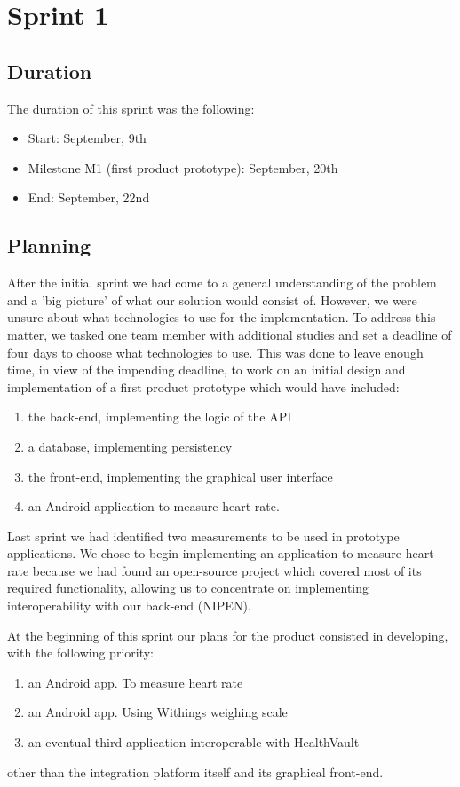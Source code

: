 	
\chapter{Sprint 1}
\label{Sprint1}

\section{Duration}
The duration of this sprint was the following:
\begin{itemize}
\item Start: September, 9th
\item Milestone M1 (first product prototype): September, 20th
\item End: September, 22nd
\end{itemize}

\section{Planning}

After the initial sprint we had come to a general understanding of the problem and a 'big picture' of what our solution would consist of. 
However, we were unsure about what technologies to use for the implementation. 
To address this matter, we tasked one team member with additional studies and set a deadline of four days to choose what technologies to use.
This was done to leave enough time, in view of the impending deadline, to work on an initial design and implementation of a first product prototype which would have included:
\begin{enumerate}
\item the back-end, implementing the logic of the API
\item a database, implementing persistency
\item the front-end, implementing the graphical user interface
\item an Android application to measure heart rate.
\end{enumerate}

Last sprint we had identified two measurements to be used in prototype applications.
We chose to begin implementing an application to measure heart rate because we had found an open-source project which covered most of its required functionality, allowing us to concentrate on implementing interoperability with our back-end (NIPEN).

At the beginning of this sprint our plans for the product consisted in developing, with the following priority:
\begin{enumerate}[1.]
\item an Android app. To measure heart rate
\item an Android app. Using Withings weighing scale
\item an eventual third application interoperable with HealthVault
\end{enumerate}
other than the integration platform itself and its graphical front-end.

